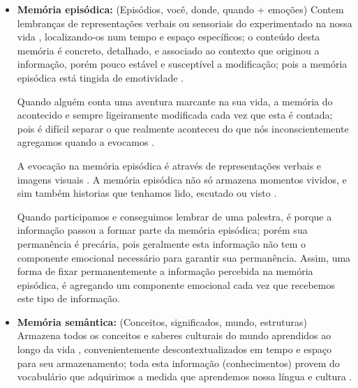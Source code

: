 \begin{itemize}
\item \textbf{Memória episódica:}  (Episódios, você, donde, quando + emoções)
\label{posref:memoriaepisodica}
Contem lembranças de representações verbais ou sensoriais do experimentado na nossa vida \cite[pp. 138]{pake2019psicologia} \cite[pp. 34-35]{de2000comprension}, 
localizando-os num tempo e espaço específicos;
o conteúdo desta memória é concreto, detalhado, e associado ao contexto que originou a informação,
porém pouco estável e susceptível a modificação; 
pois a memória episódica está tingida de emotividade
\cite[pp. 34-35]{de2000comprension}.
\begin{example}
Quando alguém conta uma aventura marcante na sua vida,
a memória do acontecido e sempre ligeiramente modificada cada vez que esta é contada;
pois é difícil separar o que realmente aconteceu do que nós inconscientemente agregamos quando a evocamos
\cite[pp. 35]{de2000comprension}.
\end{example}
A  evocação na memória episódica é através de representações verbais e imagens visuais
\cite[pp. 35]{de2000comprension}.
A memória episódica não só armazena momentos vividos, 
e sim também historias que tenhamos lido, escutado ou visto
\cite[pp. 35]{de2000comprension}.
\begin{example}
Quando participamos e conseguimos lembrar de uma palestra, 
é porque a informação passou a formar parte da memória episódica;
porém sua permanência é precária, 
pois geralmente esta  informação não tem o componente emocional necessário para garantir sua permanência.
Assim, uma forma de fixar permanentemente a informação percebida na memória episódica,
é agregando um componente emocional cada vez que recebemos este tipo de informação.
\end{example}
\item \textbf{Memória semântica:} (Conceitos, significados, mundo, estruturas)
\label{posref:memoriasemantica}
Armazena todos os conceitos e saberes culturais do mundo aprendidos ao longo da vida 
\cite[pp. 139]{pake2019psicologia} \cite[pp. 34]{de2000comprension},
convenientemente descontextualizados em tempo e espaço para seu armazenamento;
toda esta informação (conhecimentos) provem do vocabulário que adquirimos a medida que aprendemos nossa língua e cultura
\cite[pp. 34]{de2000comprension}.

\end{itemize}
